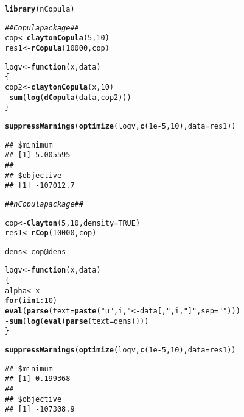 \documentclass[11pt, english]{article}\usepackage[]{graphicx}\usepackage[]{color}
\makeatletter
\newcommand{\hlnum}[1]{\textcolor[rgb]{0.686,0.059,0.569}{#1}}%
\newcommand{\hlstr}[1]{\textcolor[rgb]{0.192,0.494,0.8}{#1}}%
\newcommand{\hlcom}[1]{\textcolor[rgb]{0.678,0.584,0.686}{\textit{#1}}}%
\newcommand{\hlopt}[1]{\textcolor[rgb]{0,0,0}{#1}}%
\newcommand{\hlstd}[1]{\textcolor[rgb]{0.345,0.345,0.345}{#1}}%
\newcommand{\hlkwa}[1]{\textcolor[rgb]{0.161,0.373,0.58}{\textbf{#1}}}%
\newcommand{\hlkwb}[1]{\textcolor[rgb]{0.69,0.353,0.396}{#1}}%
\newcommand{\hlkwc}[1]{\textcolor[rgb]{0.333,0.667,0.333}{#1}}%
\newcommand{\hlkwd}[1]{\textcolor[rgb]{0.737,0.353,0.396}{\textbf{#1}}}%
\newenvironment{kframe}{%
 \def\at@end@of@kframe{}%
 \ifinner\ifhmode%
  \def\at@end@of@kframe{\end{minipage}}%
  \begin{minipage}{\columnwidth}%
 \fi\fi%
 \def\FrameCommand##1{\hskip\@totalleftmargin \hskip-\fboxsep
 \colorbox{shadecolor}{##1}\hskip-\fboxsep
     \hskip-\linewidth \hskip-\@totalleftmargin \hskip\columnwidth}%
 \MakeFramed {\advance\hsize-\width
   \@totalleftmargin\z@ \linewidth\hsize
   \@setminipage}}%
 {\par\unskip\endMakeFramed%
 \at@end@of@kframe}
\newenvironment{knitrout}{}{} %
\makeatother
\begin{document}
\begin{knitrout}\small
{}\color{fgcolor}\begin{kframe}
\begin{alltt}
\hlkwd{library}\hlstd{(nCopula)}
\end{alltt}


{\ttfamily\noindent\itshape\color{messagecolor}{\#\# Loading required package: copula}}

{\ttfamily\noindent\color{warningcolor}{\#\# Warning: package 'copula' was built under R version 3.3.2}}\begin{alltt}
\hlcom{## Copula package ##}
\hlstd{cop} \hlkwb{<-} \hlkwd{claytonCopula}\hlstd{(}\hlnum{5}\hlstd{,} \hlnum{10}\hlstd{)}
\hlstd{res1} \hlkwb{<-} \hlkwd{rCopula}\hlstd{(}\hlnum{10000}\hlstd{, cop)}

\hlstd{logv} \hlkwb{<-} \hlkwa{function}\hlstd{(}\hlkwc{x}\hlstd{,} \hlkwc{data}\hlstd{)}
\hlstd{\{}
  \hlstd{cop2} \hlkwb{<-} \hlkwd{claytonCopula}\hlstd{(x,} \hlnum{10}\hlstd{)}
  \hlopt{-}\hlkwd{sum}\hlstd{(}\hlkwd{log}\hlstd{(}\hlkwd{dCopula}\hlstd{(data, cop2)))}
\hlstd{\}}

\hlkwd{suppressWarnings}\hlstd{(}\hlkwd{optimize}\hlstd{(logv,} \hlkwd{c}\hlstd{(}\hlnum{1e-5}\hlstd{,} \hlnum{10}\hlstd{),} \hlkwc{data} \hlstd{= res1))}
\end{alltt}
\begin{verbatim}
## $minimum
## [1] 5.005595
## 
## $objective
## [1] -107012.7
\end{verbatim}
\begin{alltt}
\hlcom{## nCopula package ##}

\hlstd{cop} \hlkwb{<-} \hlkwd{Clayton}\hlstd{(}\hlnum{5}\hlstd{,} \hlnum{10}\hlstd{,} \hlkwc{density} \hlstd{=} \hlnum{TRUE}\hlstd{)}
\hlstd{res1} \hlkwb{<-} \hlkwd{rCop}\hlstd{(}\hlnum{10000}\hlstd{, cop)}

\hlstd{dens} \hlkwb{<-} \hlstd{cop}\hlopt{@}\hlkwc{dens}

\hlstd{logv} \hlkwb{<-} \hlkwa{function}\hlstd{(}\hlkwc{x}\hlstd{,} \hlkwc{data}\hlstd{)}
\hlstd{\{}
  \hlstd{alpha} \hlkwb{<-} \hlstd{x}
  \hlkwa{for} \hlstd{(i} \hlkwa{in} \hlnum{1}\hlopt{:}\hlnum{10}\hlstd{)}
    \hlkwd{eval}\hlstd{(}\hlkwd{parse}\hlstd{(}\hlkwc{text} \hlstd{=} \hlkwd{paste}\hlstd{(}\hlstr{"u"}\hlstd{, i,} \hlstr{" <- data[,"}\hlstd{, i,} \hlstr{"]"}\hlstd{,} \hlkwc{sep} \hlstd{=} \hlstr{""}\hlstd{)))}
  \hlopt{-}\hlkwd{sum}\hlstd{(}\hlkwd{log}\hlstd{(}\hlkwd{eval}\hlstd{(}\hlkwd{parse}\hlstd{(}\hlkwc{text} \hlstd{= dens))))}
\hlstd{\}}

\hlkwd{suppressWarnings}\hlstd{(}\hlkwd{optimize}\hlstd{(logv,} \hlkwd{c}\hlstd{(}\hlnum{1e-5}\hlstd{,} \hlnum{10}\hlstd{),} \hlkwc{data} \hlstd{= res1))}
\end{alltt}
\begin{verbatim}
## $minimum
## [1] 0.199368
## 
## $objective
## [1] -107308.9
\end{verbatim}
\end{kframe}
\end{knitrout}
\end{document}
